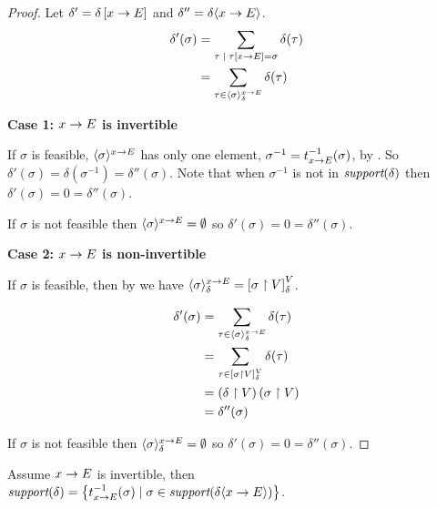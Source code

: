 \begin{proof} Let $ \delta' = \delta \left[ x \rightarrow E \right] $ and $ \delta''
= \delta \langle x \rightarrow E \rangle $.
\begin{align*}
\delta'(\sigma)
& = \sum_{\tau \;|\; \tau \left[ x \rightarrow E \right] = \sigma} \delta (\tau) \\
& = \sum_{\tau \in \langle \sigma \rangle^{x \rightarrow E}_\delta} \delta (\tau)
\end{align*}

\textbf{Case 1: $ x \rightarrow E $ is invertible}

If $ \sigma $ is feasible, $ \langle \sigma \rangle^{x \rightarrow E} $ has only one
element, $ \sigma^{-1} = t_{x \rightarrow E}^{-1}(\sigma) $,
by . So $ \delta'(\sigma)
= \delta(\sigma^{-1}) = \delta''(\sigma) $. Note that when
$ \sigma^{-1} $ is not in $ \textit{support}(\delta) $ then $ \delta'(\sigma)
= 0 = \delta''(\sigma) $.

If $ \sigma $ is not feasible then $ \langle \sigma \rangle^{x \rightarrow E}
= \emptyset $ so $ \delta'(\sigma) = 0 = \delta''(\sigma) $.

\textbf{Case 2: $ x \rightarrow E $ is non-invertible}

If $ \sigma $ is feasible, then by  we
have $ \langle \sigma \rangle^{x \rightarrow E}_\delta
= \left[ \sigma \upharpoonright V \right]_{\delta}^{V} $.

\begin{align*}
\delta'(\sigma)
& = \sum_{\tau \in \langle \sigma \rangle^{x \rightarrow E}_\delta} \delta (\tau) \\
& = \sum_{\tau \in \left[ \sigma \upharpoonright V \right]_{\delta}^{V}} \delta
(\tau)  \\
& = \left( \delta \upharpoonright V \right)(\sigma \upharpoonright V) \\
& = \delta''(\sigma)
\end{align*}

If $ \sigma $ is not feasible then
$ \langle \sigma \rangle^{x \rightarrow E}_\delta = \emptyset $ so
$ \delta'(\sigma) = 0 = \delta''(\sigma) $.

\end{proof}

\begin{lemma} \label{thm:pp:assign:support} Assume $ x \rightarrow E $ is invertible, then $ \textit{support}(\delta)
= \left\{ t_{x \rightarrow E}^{-1}(\sigma) \;|\; \sigma \in \textit{support}(\delta \langle x \rightarrow E \rangle) \right\} $.
\end{lemma}

